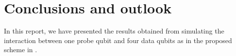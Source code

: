 
\section{Conclusions and outlook }
In this report, we have presented the results obtained from simulating the interaction between one probe qubit and four data qubits as in the proposed scheme in \cite{the paper}. 

